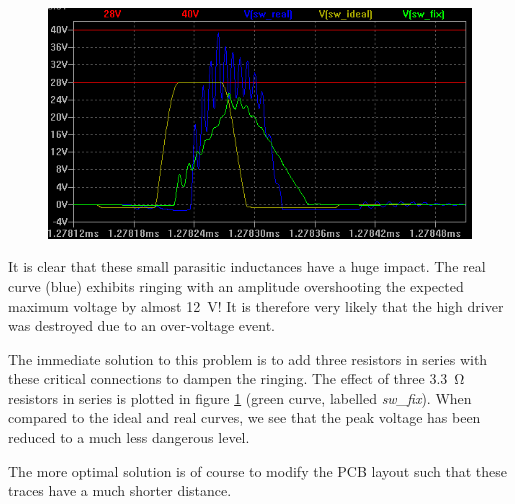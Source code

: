 \begin{figure}[th!]
    \centering
    \includegraphics[width=.7\textwidth]{images/sim/lt3741-transients-sim.png}
    \caption{}
    \label{fig:verification:long_traces_simulation}
\end{figure}

It is clear that these small parasitic  inductances have a huge impact. The real
curve  (blue) exhibits ringing  with  an  amplitude  overshooting  the  expected
maximum voltage by  almost  \SI{12}{\volt}! It is therefore very likely that the
high driver was destroyed due to an over-voltage event.

The immediate solution to this problem  is to add three resistors in series with
these  critical   connections  to  dampen  the  ringing.  The  effect  of  three
\SI{3.3}{\ohm}     resistors     in     series    is    plotted    in     figure
\ref{fig:verification:long_traces_simulation}     (green     curve,     labelled
\emph{sw\_fix}).  When  compared  to  the ideal and real curves, we see that the
peak voltage has been reduced to a much less dangerous level.

The more optimal  solution is of course to modify the PCB layout such that these
traces have a much shorter distance.

